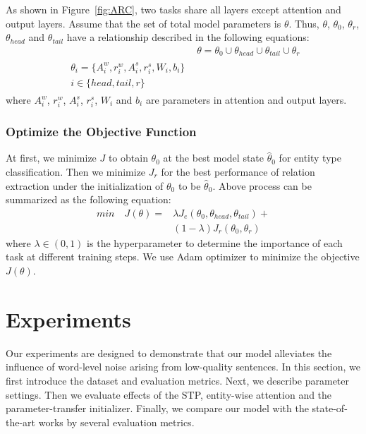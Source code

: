 \documentclass[11pt,a4paper]{article}
\begin{document}
  As shown in Figure~\ref{fig:ARC}, two tasks share all layers except attention and output layers. Assume that the set of total model parameters is $\theta$. Thus, $\theta$, $\theta_0$, $\theta_r$, $\theta_{head}$ and $\theta_{tail}$ have a relationship described in the following equations:
  \begin{align}
    &\theta=\theta_0 \cup \theta_{head} \cup \theta_{tail} \cup \theta_r\\
    \begin{split}
    \theta_i=\{A^w_i,r^w_i,A^s_i,r^s_i,W_i,b_i\} \\
    i \in \{head,tail,r\}
    \end{split}
  \end{align}
  where $A^w_i$, $r^w_i$, $A^s_i$, $r^s_i$, $W_i$ and $b_i$ are parameters in attention and output layers.
  
  \subsubsection*{Optimize the Objective Function}
  At first, we minimize $J$ to obtain $\theta_0$ at the best model state $\hat{\theta}_0$ for entity type classification. Then we minimize $J_r$ for the best performance of relation extraction under the initialization of $\theta_0$ to be $\hat{\theta}_0$. Above process can be summarized as the following equation:
  \begin{equation}
    \begin{split}
    min \quad J(\theta)=&\lambda J_e(\theta_0,\theta_{head},\theta_{tail})+\\
    &(1-\lambda)J_r(\theta_0,\theta_r)
    \end{split}
  \end{equation}
  where $\lambda \in(0,1)$ is the hyperparameter to determine the importance of each task at different training steps. We use Adam \citep{kingma2014adam} optimizer to minimize the objective $J(\theta)$.

\section{Experiments}
  Our experiments are designed to demonstrate that our model alleviates the influence of word-level noise arising from low-quality sentences. In this section, we first introduce the dataset and evaluation metrics. Next, we describe parameter settings. Then we evaluate effects of the STP, entity-wise attention and the parameter-transfer initializer. Finally, we compare our model with the state-of-the-art works by several evaluation metrics.
\end{document}
